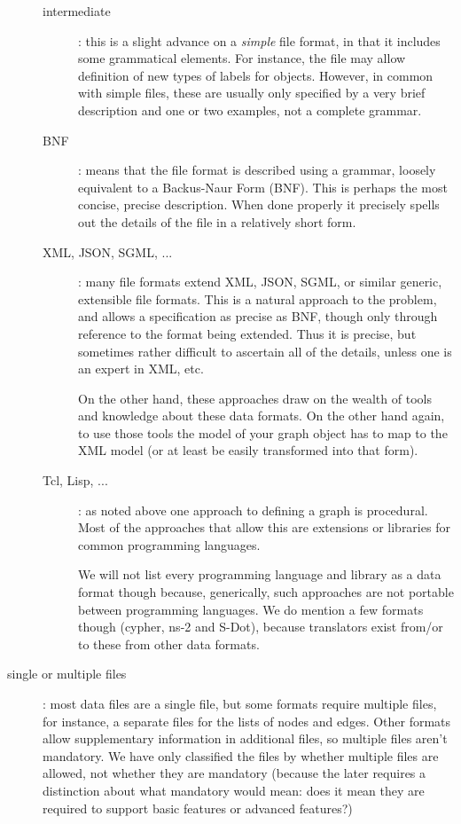 \documentclass{sig-alternate}
\begin{document}
\begin{description}
\begin{description}
  \item[intermediate]: this is a slight advance on a {\em simple} file
    format, in that it includes some grammatical elements. For
    instance, the file may allow definition of new types of labels for
    objects. However, in common with simple files, these are usually
    only specified by a very brief description and one or two
    examples, not a complete grammar.

  \item[BNF]: means that the file format is described using a grammar,
    loosely equivalent to a Backus-Naur Form (BNF). This is perhaps
    the most concise, precise description. When done properly it
    precisely spells out the details of the file in a relatively short
    form.


  \item[XML, JSON, SGML, ...]: many file formats extend XML, JSON,
    SGML, or similar generic, extensible file formats. This is a
    natural approach to the problem, and allows a specification as
    precise as BNF, though only through reference to the format being
    extended. Thus it is precise, but sometimes rather difficult to
    ascertain all of the details, unless one is an expert in XML, etc.

    On the other hand, these approaches draw on the wealth of tools
    and knowledge about these data formats. On the other hand again,
    to use those tools the model of your graph object has to map to
    the XML model (or at least be easily transformed into that form).

  \item[Tcl, Lisp, ...]: as noted above one approach to defining a
    graph is procedural. Most of the approaches that allow this are
    extensions or libraries for common programming languages. 

    We will not list every programming language and library as a data
    format though because, generically, such approaches are not
    portable between programming languages. We do mention a few
    formats though (cypher, ns-2 and S-Dot), because translators exist
    from/or to these from other data formats.

  \end{description}

\item[single or multiple files]: most data files are a single file,
  but some formats require multiple files, for instance, a separate
  files for the lists of nodes and edges. Other formats allow
  supplementary information in additional files, so multiple files
  aren't mandatory. We have only classified the files by whether
  multiple files are allowed, not whether they are mandatory (because
  the later requires a distinction about what mandatory would mean:
  does it mean they are required to support basic features or advanced
  features?) 


\end{description}
\end{document}
